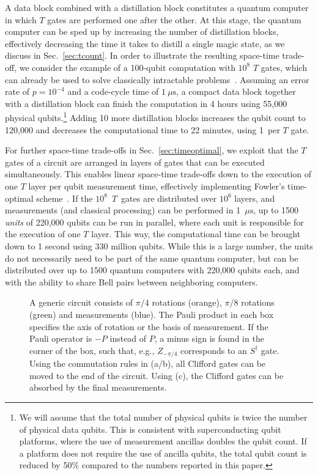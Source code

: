 \documentclass[prx,aps,letterpaper,twocolumn,allowfontchageintitle=true,accepted=2019-02-01]{quantumarticle}
\begin{document}
A data block combined with a distillation block constitutes a quantum computer in which $T$ gates are performed one after the other. At this stage, the quantum computer can be sped up by increasing the number of distillation blocks, effectively decreasing the time it takes to distill a single magic state, as we discuss in Sec.~\ref{sec:tcount}. In order to illustrate the resulting space-time trade-off, we consider the example of a 100-qubit computation with $10^8$ $T$ gates, which can already be used to solve classically intractable problems~\cite{Babbush2018}. Assuming an error rate of $p=10^{-4}$ and a code-cycle time of $1~\mu\mathrm{s}$, a compact data block together with a distillation block can finish the computation in 4 hours using 55,000 physical qubits.\footnote{We will assume that the total number of physical qubits is twice the number of physical data qubits. This is consistent with superconducting qubit platforms, where the use of measurement ancillas doubles the qubit count. If a platform does not require the use of ancilla qubits, the total qubit count is reduced by 50\% compared to the numbers reported in this paper.} Adding 10 more distillation blocks increases the qubit count to 120,000 and decreases the computational time to 22 minutes, using 1\clock \ per $T$ gate. 

For further space-time trade-offs in Sec.~\ref{sec:timeoptimal}, we exploit that the $T$ gates of a circuit are arranged in layers of gates that can be executed simultaneously. This enables linear space-time trade-offs down to the execution of one $T$ layer per qubit measurement time, effectively implementing Fowler's time-optimal scheme~\cite{Fowler2012a}. If the $10^8$~$T$~gates are distributed over $10^6$ layers, and measurements (and classical processing) can be performed in 1~$\mu\mathrm{s}$, up to 1500 \textit{units} of 220,000 qubits can be run in parallel, where each unit is responsible for the execution of one $T$ layer. This way, the computational time can be brought down to 1 second using 330 million qubits. While this is a large number, the units do not necessarily need to be part of the same quantum computer, but can be distributed over up to 1500 quantum computers with 220,000 qubits each, and with the ability to share Bell pairs between neighboring computers.



\begin{figure}[t!]
\centering
\def\svgwidth{\linewidth}

\caption{A generic circuit consists of $\pi/4$ rotations (orange), $\pi/8$ rotations (green) and measurements (blue). The Pauli product in each box specifies the axis of rotation or the basis of measurement. If the Pauli operator is $-P$ instead of $P$, a minus sign is found in the corner of the box, such that, e.g., $Z_{-\pi/4}$ corresponds to an $S^\dagger$ gate. Using the commutation rules in (a/b), all Clifford gates can be moved to the end of the circuit. Using (c), the Clifford gates can be absorbed by the final measurements.}
\label{fig:circuitsimplify}
\end{figure}
\end{document}
